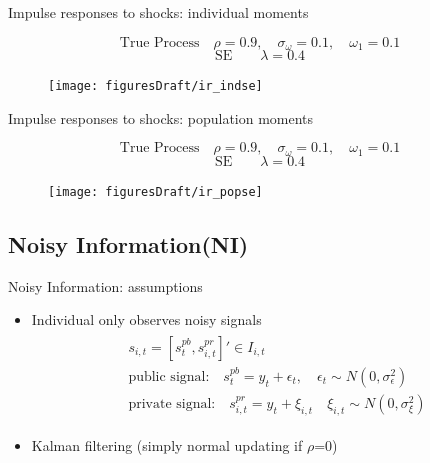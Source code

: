 \documentclass{beamer}
\begin{document}
\begin{frame}{Impulse responses to shocks: individual moments}

$$\textrm{True Process} \quad  \rho=0.9, \quad \sigma_\omega=0.1, \quad \omega_1 = 0.1$$
$$\textrm{SE} \quad \quad  \lambda = 0.4 $$ 
\begin{figure}
	\texttt{[image: figuresDraft/ir\_indse]} 
\end{figure}
\end{frame}


\begin{frame}{Impulse responses to shocks: population moments}

$$\textrm{True Process} \quad  \rho=0.9, \quad \sigma_\omega=0.1, \quad \omega_1 = 0.1$$
$$\textrm{SE} \quad \quad  \lambda = 0.4 $$ 

\begin{figure}
	\texttt{[image: figuresDraft/ir\_popse]} 
\end{figure}

\end{frame}

\subsection{Noisy Information(NI)}

\begin{frame}{Noisy Information: assumptions}
\begin{itemize}
	\item Individual only observes noisy signals 
	\begin{eqnarray*}
		\begin{aligned}
			& s_{i,t}=[s^{pb}_t, s^{pr}_{i,t}]' \in I_{i,t} \\
			&\text{public signal:} \quad s^{pb}_t = y_t + \epsilon_t, \quad \epsilon_t \sim N(0,\sigma^2_\epsilon)\\ 
			& \text{private signal:} \quad s^{pr}_{i,t} = y_t + \xi_{i,t} \quad \xi_{i,t} \sim N(0,\sigma^2_\xi)
		\end{aligned}
	\end{eqnarray*} 
   
	\item Kalman filtering (simply normal updating if $\rho$=0)
\end{itemize}
\end{frame}
\end{document}
